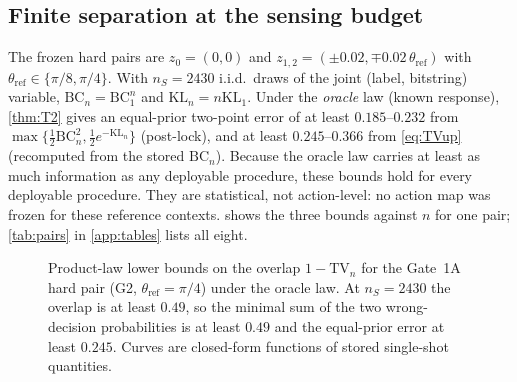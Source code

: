 \documentclass[10pt,twocolumn]{article}
\theoremstyle{definition}
\theoremstyle{remark}
\newcommand{\TV}{\mathrm{TV}}
\newcommand{\KL}{\mathrm{KL}}
\newcommand{\BC}{\mathrm{BC}}
\begin{document}
\subsection{Finite separation at the sensing budget}
The frozen hard pairs are $z_0=(0,0)$ and $z_{1,2}=(\pm0.02,\mp0.02\,\theta_{\mathrm{ref}})$ with $\theta_{\mathrm{ref}}\in\{\pi/8,\pi/4\}$. With $n_S=2430$ i.i.d.\ draws of the joint (label, bitstring) variable, $\BC_n=\BC_1^n$ and $\KL_n=n\KL_1$. Under the \emph{oracle} law (known response), \cref{thm:T2} gives an equal-prior two-point error of at least $0.185$--$0.232$ from $\max\{\tfrac12\BC_n^2,\tfrac12e^{-\KL_n}\}$ (post-lock), and at least $0.245$--$0.366$ from \eqref{eq:TVup} (recomputed from the stored $\BC_n$). Because the oracle law carries at least as much information as any deployable procedure, these bounds hold for every deployable procedure. They are statistical, not action-level: no action map was frozen for these reference contexts.  shows the three bounds against $n$ for one pair; \cref{tab:pairs} in \cref{app:tables} lists all eight.

\begin{figure}[t]
\centering
{}
\caption{Product-law lower bounds on the overlap $1-\TV_n$ for the Gate~1A hard pair (G2, $\theta_{\mathrm{ref}}=\pi/4$) under the oracle law. At $n_S=2430$ the overlap is at least $0.49$, so the minimal sum of the two wrong-decision probabilities is at least $0.49$ and the equal-prior error at least $0.245$. Curves are closed-form functions of stored single-shot quantities.}
\label{fig:lb}
\end{figure}
\end{document}
